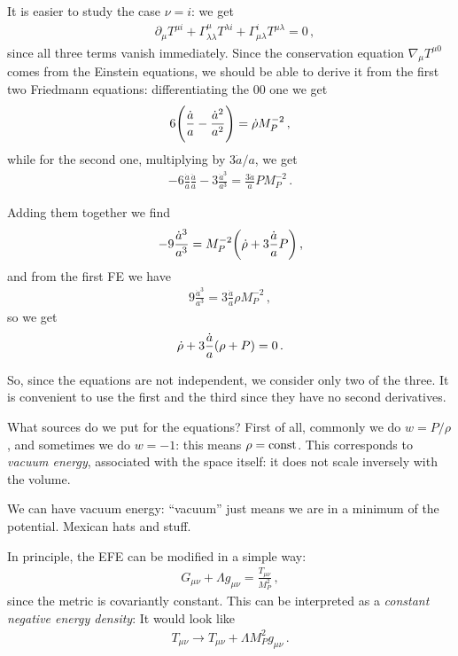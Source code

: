 \documentclass[main.tex]{subfiles}
\begin{document}
It is easier to study the case \(\nu = i\): we get 
%
\begin{align}
    &\partial_{\mu } T^{\mu i} + \Gamma^{\mu }_{\lambda \lambda  } T^{\lambda i} + \Gamma^{i}_{\mu \lambda } T^{\mu \lambda } = 0
\,,
\end{align}
%
since all three terms vanish immediately. Since the conservation  equation \(\nabla_{\mu } T^{\mu 0}\) comes from the Einstein equations, we should be able to derive it from the first two Friedmann equations: differentiating the 00 one we get 
%
\begin{align}
  6 \qty(\frac{\dot{a}}{a} - \frac{\dot{a}^2}{a^2}) = \dot{\rho} M_P^{-2} 
\,,
\end{align}
%
while for the second one, multiplying by \(3 \dot{a} / a\), we get 
%
\begin{align}
  - 6 \frac{\dot{a}}{a} \frac{\ddot{a}}{a}
  - 3 \frac{\dot{a}^3}{a^3} = \frac{3 \dot{a}}{a } P M_P^{-2}
\,.
\end{align}

Adding them together we find 
%
\begin{align}
  - 9 \frac{\dot{a}^3}{a^3} = M_P^{-2} \qty( \dot{\rho} + 3 \frac{\dot{a}}{a }P )
\,,
\end{align}
%
and from the first FE we have 
%
\begin{align}
  9 \frac{\dot{a}^3}{a^3} = 3 \frac{\dot{a}}{a} \rho M_P^{-2}
\,,
\end{align}
%
so we get 
%
\begin{align}
  \dot{\rho}
 + 3 \frac{\dot{a}}{a} \qty(\rho +P) = 0  
\,.
\end{align}

So, since the equations are not independent, we consider  only two of the three. It is convenient to use the first and the third since they have no second derivatives.  

What sources do we put for the equations? First of all, commonly we do \(w = P / \rho \), and sometimes we do \(w = -1\): this means \(\rho = \text{const}\). 
This corresponds to \emph{vacuum energy}, associated with the space itself: it does not scale inversely with the volume. 

We can have vacuum energy: ``vacuum'' just means we are in a minimum of the potential. Mexican hats and stuff. 

In principle, the EFE can be modified in a simple way: 
%
\begin{align}
  G_{\mu \nu } + \Lambda g_{\mu  \nu } = \frac{T_{\mu \nu }}{M_P^2}
\,,
\end{align}
%
since the metric is covariantly constant. This can be interpreted as a \emph{constant negative energy density}: It would look like 
%
\begin{align}
  T_{\mu \nu } \rightarrow T_{\mu \nu } + \Lambda M_P^2 g_{\mu \nu }
\,.
\end{align}
\end{document}
